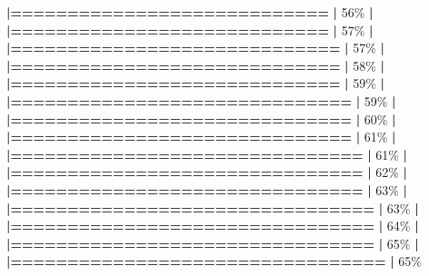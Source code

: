 \documentclass[
]{book}
\newenvironment{Shaded}{\begin{snugshade}}{\end{snugshade}}
\newcommand{\DecValTok}[1]{\textcolor[rgb]{0.00,0.00,0.81}{#1}}
\newcommand{\ErrorTok}[1]{\textcolor[rgb]{0.64,0.00,0.00}{\textbf{#1}}}
\newcommand{\NormalTok}[1]{#1}
\newcommand{\SpecialCharTok}[1]{\textcolor[rgb]{0.81,0.36,0.00}{\textbf{#1}}}
\begin{document}
\begin{Shaded}
\begin{Highlighting}[]
  \ErrorTok{|============================}                      \ErrorTok{|}  \DecValTok{56}\NormalTok{\%}
  \SpecialCharTok{|}                                                        
  \ErrorTok{|============================}                      \ErrorTok{|}  \DecValTok{57}\NormalTok{\%}
  \SpecialCharTok{|}                                                        
  \ErrorTok{|=============================}                     \ErrorTok{|}  \DecValTok{57}\NormalTok{\%}
  \SpecialCharTok{|}                                                        
  \ErrorTok{|=============================}                     \ErrorTok{|}  \DecValTok{58}\NormalTok{\%}
  \SpecialCharTok{|}                                                        
  \ErrorTok{|=============================}                     \ErrorTok{|}  \DecValTok{59}\NormalTok{\%}
  \SpecialCharTok{|}                                                        
  \ErrorTok{|==============================}                    \ErrorTok{|}  \DecValTok{59}\NormalTok{\%}
  \SpecialCharTok{|}                                                        
  \ErrorTok{|==============================}                    \ErrorTok{|}  \DecValTok{60}\NormalTok{\%}
  \SpecialCharTok{|}                                                        
  \ErrorTok{|==============================}                    \ErrorTok{|}  \DecValTok{61}\NormalTok{\%}
  \SpecialCharTok{|}                                                        
  \ErrorTok{|===============================}                   \ErrorTok{|}  \DecValTok{61}\NormalTok{\%}
  \SpecialCharTok{|}                                                        
  \ErrorTok{|===============================}                   \ErrorTok{|}  \DecValTok{62}\NormalTok{\%}
  \SpecialCharTok{|}                                                        
  \ErrorTok{|===============================}                   \ErrorTok{|}  \DecValTok{63}\NormalTok{\%}
  \SpecialCharTok{|}                                                        
  \ErrorTok{|================================}                  \ErrorTok{|}  \DecValTok{63}\NormalTok{\%}
  \SpecialCharTok{|}                                                        
  \ErrorTok{|================================}                  \ErrorTok{|}  \DecValTok{64}\NormalTok{\%}
  \SpecialCharTok{|}                                                        
  \ErrorTok{|================================}                  \ErrorTok{|}  \DecValTok{65}\NormalTok{\%}
  \SpecialCharTok{|}                                                        
  \ErrorTok{|=================================}                 \ErrorTok{|}  \DecValTok{65}\NormalTok{\%}

\end{Highlighting}
\end{Shaded}
\end{document}
